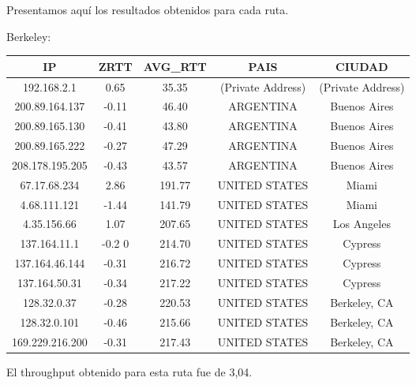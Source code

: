 Presentamos aquí los resultados obtenidos para cada ruta.

Berkeley:

\begin{tabular}{|c@{\hspace{5ex}}c@{\hspace{5ex}}c@{\hspace{5ex}}c@{\hspace{5ex}}c|}
 \hline
 \rule{0pt}{1.2em}IP & ZRTT & AVG\_RTT & PAIS & CIUDAD\\[0.2em]
 \hline

\rule{0pt}{1.2em} 192.168.2.1  &  0.65 & 35.35 & (Private Address) & (Private Address) \\[0.2em]
\rule{0pt}{1.2em} 200.89.164.137  &  -0.11 & 46.40 & ARGENTINA & Buenos Aires \\[0.2em]
\rule{0pt}{1.2em} 200.89.165.130  &  -0.41 & 43.80 & ARGENTINA & Buenos Aires \\[0.2em]
\rule{0pt}{1.2em} 200.89.165.222  &  -0.27 & 47.29 & ARGENTINA & Buenos Aires \\[0.2em]
\rule{0pt}{1.2em} 208.178.195.205  &  -0.43 & 43.57 & ARGENTINA & Buenos Aires \\[0.2em]
\rule{0pt}{1.2em} 67.17.68.234  &  2.86 & 191.77 & UNITED STATES & Miami \\[0.2em]
\rule{0pt}{1.2em} 4.68.111.121  &  -1.44 & 141.79 & UNITED STATES & Miami \\[0.2em]
\rule{0pt}{1.2em} 4.35.156.66  &  1.07 & 207.65 & UNITED STATES & Los Angeles \\[0.2em]
\rule{0pt}{1.2em} 137.164.11.1  &  -0.2 0& 214.70 & UNITED STATES & Cypress \\[0.2em]
\rule{0pt}{1.2em} 137.164.46.144  &  -0.31 & 216.72 & UNITED STATES & Cypress \\[0.2em]
\rule{0pt}{1.2em} 137.164.50.31  &  -0.34 & 217.22 & UNITED STATES & Cypress \\[0.2em]
\rule{0pt}{1.2em} 128.32.0.37  &  -0.28 & 220.53 & UNITED STATES & Berkeley, CA \\[0.2em]
\rule{0pt}{1.2em} 128.32.0.101  &  -0.46 & 215.66 & UNITED STATES & Berkeley, CA \\[0.2em]
\rule{0pt}{1.2em} 169.229.216.200  &  -0.31 & 217.43 & UNITED STATES & Berkeley, CA \\[0.2em]
\hline
 \end{tabular}

El throughput obtenido para esta ruta fue de 3,04.

\medskip

